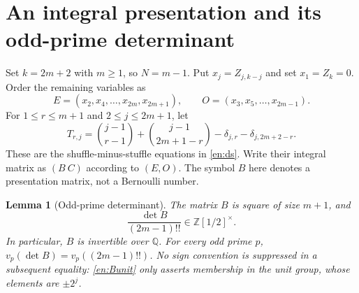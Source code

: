\documentclass[12pt]{amsart}
\newtheorem{lem}[thm]{Lemma}
\theoremstyle{definition}
\theoremstyle{remark}
\numberwithin{equation}{section}
\newcommand{\Z}{\mathbb{Z}}
\newcommand{\Q}{\mathbb{Q}}
\newcommand{\Rdy}{\Z[1/2]}
\theoremstyle{definition}
\theoremstyle{remark}
\begin{document}
\section{An integral presentation and its odd-prime determinant}
Set $k=2m+2$ with $m\geq1$, so $N=m-1$. Put
$x_j=Z_{j,k-j}$ and set $x_1=Z_k=0$. Order the remaining variables as
\[
 E=(x_2,x_4,\ldots,x_{2m},x_{2m+1}),\qquad
 O=(x_3,x_5,\ldots,x_{2m-1}).
\]
For $1\leq r\leq m+1$ and $2\leq j\leq2m+1$, let
\begin{equation}\label{en:Tentry}
 T_{r,j}=\binom{j-1}{r-1}+\binom{j-1}{2m+1-r}
                  -\delta_{j,r}-\delta_{j,2m+2-r}.
\end{equation}
These are the shuffle-minus-stuffle equations in \eqref{en:ds}.
Write their integral matrix as $(B\ C)$ according to $(E,O)$.
The symbol $B$ here denotes a presentation matrix, not a Bernoulli number.

\begin{lem}[Odd-prime determinant]\label{en:Blemma}
The matrix $B$ is square of size $m+1$, and
\begin{equation}\label{en:Bunit}
 \frac{\det B}{(2m-1)!!}\in\Rdy^{\times}.
\end{equation}
In particular, $B$ is invertible over $\Q$. For every odd prime $p$,
$v_p(\det B)=v_p((2m-1)!!)$. No sign convention is suppressed in a
subsequent equality: \eqref{en:Bunit} only asserts membership in the
unit group, whose elements are $\pm2^j$.
\end{lem}
\end{document}
